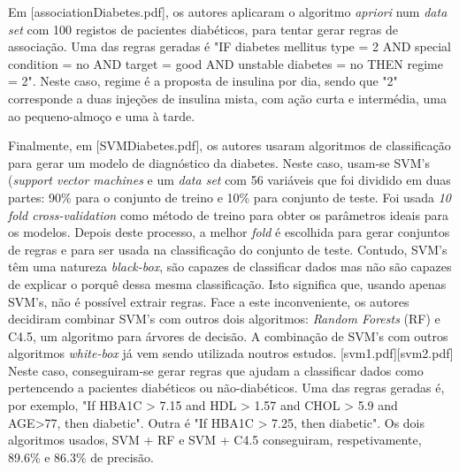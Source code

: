 Em [associationDiabetes.pdf], os autores aplicaram o algoritmo \textit{apriori} num \textit{data set} com 100 registos de pacientes diabéticos, para tentar gerar regras de associação. Uma das regras geradas é "IF diabetes mellitus type = 2 AND special condition = no AND target = good AND unstable diabetes = no THEN regime = 2". Neste caso, regime é a proposta de insulina por dia, sendo que "2" corresponde a duas injeções de insulina mista, com ação curta e intermédia, uma ao pequeno-almoço e uma à tarde. 

Finalmente, em [SVMDiabetes.pdf], os autores usaram algoritmos de classificação para gerar um modelo de diagnóstico da diabetes. Neste caso, usam-se SVM's (\textit{support vector machines} e um \textit{data set} com 56 variáveis que foi dividido em duas partes: 90\% para o conjunto de treino e 10\% para conjunto de teste. Foi usada \textit{10 fold cross-validation} como método de treino para obter os parâmetros ideais para os modelos. Depois deste processo, a melhor \textit{fold} é escolhida para gerar conjuntos de regras e para ser usada na classificação do conjunto de teste. Contudo, SVM's têm uma natureza \textit{black-box}, são capazes de classificar dados mas não são capazes de explicar o porquê dessa mesma classificação. Isto significa que, usando apenas SVM's, não é possível extrair regras. Face a este inconveniente, os autores decidiram combinar SVM's com outros dois algoritmos: \textit{Random Forests} (RF) e C4.5, um algoritmo para árvores de decisão. A combinação de SVM's com outros algoritmos \textit{white-box} já vem sendo utilizada noutros estudos. [svm1.pdf][svm2.pdf] Neste caso, conseguiram-se gerar regras que ajudam a classificar dados como pertencendo a pacientes diabéticos ou não-diabéticos. Uma das regras geradas é, por exemplo,  "If HBA1C > 7.15 and HDL > 1.57 and CHOL > 5.9 and AGE>77, then diabetic". 
Outra é "If HBA1C > 7.25, then diabetic". Os dois algoritmos usados, SVM + RF e SVM + C4.5 conseguiram, respetivamente, 89.6\% e 86.3\% de precisão.






